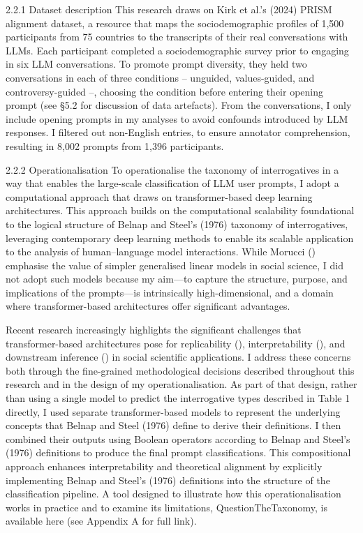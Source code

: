 \documentclass[
  12pt,
]{article}
\begin{document}
2.2.1 Dataset description
This research draws on Kirk et al.'s (2024) PRISM alignment dataset, a resource that maps the sociodemographic profiles of 1,500 participants from 75 countries to the transcripts of their real conversations with LLMs. Each participant completed a sociodemographic survey prior to engaging in six LLM conversations. To promote prompt diversity, they held two conversations in each of three conditions -- unguided, values-guided, and controversy-guided --, choosing the condition before entering their opening prompt (see §5.2 for discussion of data artefacts). From the conversations, I only include opening prompts in my analyses to avoid confounds introduced by LLM responses. I filtered out non-English entries, to ensure annotator comprehension, resulting in 8,002 prompts from 1,396 participants.

2.2.2 Operationalisation
To operationalise the taxonomy of interrogatives in a way that enables the large-scale classification of LLM user prompts, I adopt a computational approach that draws on transformer-based deep learning architectures. This approach builds on the computational scalability foundational to the logical structure of Belnap and Steel's (1976) taxonomy of interrogatives, leveraging contemporary deep learning methods to enable its scalable application to the analysis of human--language model interactions. While Morucci () emphasise the value of simpler generalised linear models in social science, I did not adopt such models because my aim---to capture the structure, purpose, and implications of the prompts---is intrinsically high-dimensional, and a domain where transformer-based architectures offer significant advantages.

Recent research increasingly highlights the significant challenges that transformer-based architectures pose for replicability (), interpretability (), and downstream inference () in social scientific applications. I address these concerns both through the fine-grained methodological decisions described throughout this research and in the design of my operationalisation. As part of that design, rather than using a single model to predict the interrogative types described in Table 1 directly, I used separate transformer-based models to represent the underlying concepts that Belnap and Steel (1976) define to derive their definitions. I then combined their outputs using Boolean operators according to Belnap and Steel's (1976) definitions to produce the final prompt classifications. This compositional approach enhances interpretability and theoretical alignment by explicitly implementing Belnap and Steel's (1976) definitions into the structure of the classification pipeline. A tool designed to illustrate how this operationalisation works in practice and to examine its limitations, QuestionTheTaxonomy, is available here (see Appendix A for full link).
\end{document}
